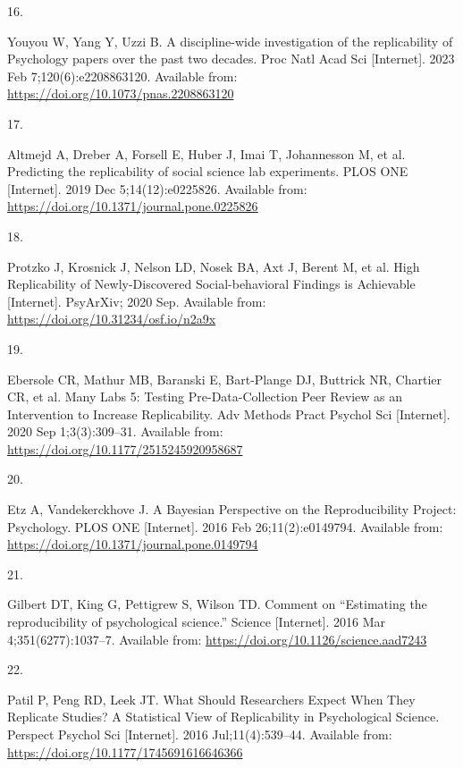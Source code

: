 \documentclass[
  english,
  a4paper,
]{article}
\newlength{\cslhangindent}
\newlength{\csllabelwidth}
\newenvironment{CSLReferences}[2] %
{\begin{list}{}{%
			\setlength{\itemindent}{0pt}
			\setlength{\leftmargin}{0pt}
			\setlength{\parsep}{0pt}
			\ifodd #1
			\setlength{\leftmargin}{\cslhangindent}
			\setlength{\itemindent}{-1\cslhangindent}
			\fi
			\setlength{\itemsep}{#2\baselineskip}}}
	{\end{list}}
\newcommand{\CSLLeftMargin}[1]{\parbox[t]{\csllabelwidth}{\strut#1\strut}}
\newcommand{\CSLRightInline}[1]{\parbox[t]{\linewidth - \csllabelwidth}{\strut#1\strut}}
\begin{document}
\begin{CSLReferences}{0}{1}
\CSLLeftMargin{16. }%
\CSLRightInline{Youyou W, Yang Y, Uzzi B. A discipline-wide investigation of the replicability of {Psychology} papers over the past two decades. Proc Natl Acad Sci {[}Internet{]}. 2023 Feb 7;120(6):e2208863120. Available from: \url{https://doi.org/10.1073/pnas.2208863120}}

\CSLLeftMargin{17. }%
\CSLRightInline{Altmejd A, Dreber A, Forsell E, Huber J, Imai T, Johannesson M, et al. Predicting the replicability of social science lab experiments. PLOS ONE {[}Internet{]}. 2019 Dec 5;14(12):e0225826. Available from: \url{https://doi.org/10.1371/journal.pone.0225826}}

\CSLLeftMargin{18. }%
\CSLRightInline{Protzko J, Krosnick J, Nelson LD, Nosek BA, Axt J, Berent M, et al. High {Replicability} of {Newly-Discovered Social-behavioral Findings} is {Achievable} {[}Internet{]}. {PsyArXiv}; 2020 Sep. Available from: \url{https://doi.org/10.31234/osf.io/n2a9x}}

\CSLLeftMargin{19. }%
\CSLRightInline{Ebersole CR, Mathur MB, Baranski E, Bart-Plange DJ, Buttrick NR, Chartier CR, et al. Many {Labs} 5: {Testing Pre-Data-Collection Peer Review} as an {Intervention} to {Increase Replicability}. Adv Methods Pract Psychol Sci {[}Internet{]}. 2020 Sep 1;3(3):309--31. Available from: \url{https://doi.org/10.1177/2515245920958687}}

\CSLLeftMargin{20. }%
\CSLRightInline{Etz A, Vandekerckhove J. A {Bayesian Perspective} on the {Reproducibility Project}: {Psychology}. PLOS ONE {[}Internet{]}. 2016 Feb 26;11(2):e0149794. Available from: \url{https://doi.org/10.1371/journal.pone.0149794}}

\CSLLeftMargin{21. }%
\CSLRightInline{Gilbert DT, King G, Pettigrew S, Wilson TD. Comment on {``{Estimating} the reproducibility of psychological science.''} Science {[}Internet{]}. 2016 Mar 4;351(6277):1037--7. Available from: \url{https://doi.org/10.1126/science.aad7243}}

\CSLLeftMargin{22. }%
\CSLRightInline{Patil P, Peng RD, Leek JT. What {Should Researchers Expect When They Replicate Studies}? {A Statistical View} of {Replicability} in {Psychological Science}. Perspect Psychol Sci {[}Internet{]}. 2016 Jul;11(4):539--44. Available from: \url{https://doi.org/10.1177/1745691616646366}}


\end{CSLReferences}
\end{document}
